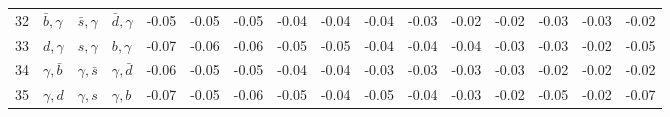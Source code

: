 \begin{tabularx}{\textwidth}{rXXX@{}S@{}S@{}S@{}S@{}S@{}S@{}S@{}S@{}S@{}S@{}S@{}S}
 32 & $\bar b,\gamma$  & $\bar s,\gamma$  & $\bar d,\gamma$ & -0.05 & -0.05 & -0.05 & -0.04 & -0.04 & -0.04 & -0.03 & -0.02 & -0.02 & -0.03 & -0.03 & -0.02 \\
 33 & $d,\gamma$       & $s,\gamma$       & $b,\gamma$      & -0.07 & -0.06 & -0.06 & -0.05 & -0.05 & -0.04 & -0.04 & -0.04 & -0.03 & -0.03 & -0.02 & -0.05 \\
 34 & $\gamma,\bar b$  & $\gamma,\bar s$  & $\gamma,\bar d$ & -0.06 & -0.05 & -0.05 & -0.04 & -0.04 & -0.03 & -0.03 & -0.03 & -0.03 & -0.02 & -0.02 & -0.02 \\
 35 & $\gamma,d$       & $\gamma,s$       & $\gamma, b$     & -0.07 & -0.05 & -0.06 & -0.05 & -0.04 & -0.05 & -0.04 & -0.03 & -0.02 & -0.05 & -0.02 & -0.07 \\ 
 \bottomrule
\end{tabularx}
